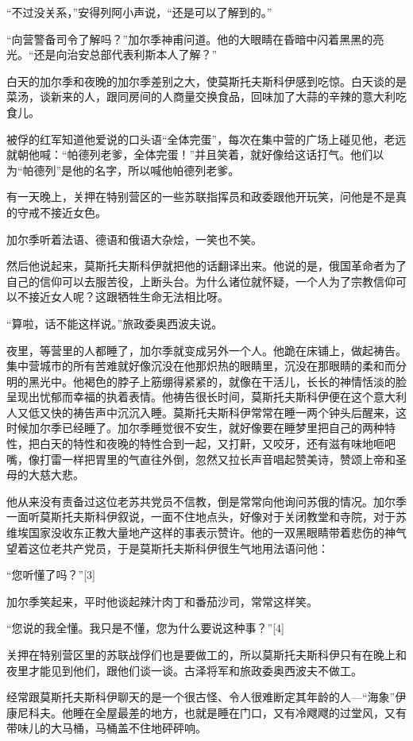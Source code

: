 “不过没关系，”安得列阿小声说，“还是可以了解到的。”

“向营警备司令了解吗？”加尔季神甫问道。他的大眼睛在昏暗中闪着黑黑的亮光。“还是向治安总部代表利斯本人了解？”

白天的加尔季和夜晚的加尔季差别之大，使莫斯托夫斯科伊感到吃惊。白天谈的是菜汤，谈新来的人，跟同房间的人商量交换食品，回味加了大蒜的辛辣的意大利吃食儿。

被俘的红军知道他爱说的口头语“全体完蛋”，每次在集中营的广场上碰见他，老远就朝他喊：“帕德列老爹，全体完蛋！”并且笑着，就好像给这话打气。他们以为“帕德列”是他的名字，所以喊他帕德列老爹。

有一天晚上，关押在特别营区的一些苏联指挥员和政委跟他开玩笑，问他是不是真的守戒不接近女色。

加尔季听着法语、德语和俄语大杂烩，一笑也不笑。

然后他说起来，莫斯托夫斯科伊就把他的话翻译出来。他说的是，俄国革命者为了自己的信仰可以去服苦役，上断头台。为什么诸位就怀疑，一个人为了宗教信仰可以不接近女人呢？这跟牺牲生命无法相比呀。

“算啦，话不能这样说。”旅政委奥西波夫说。

夜里，等营里的人都睡了，加尔季就变成另外一个人。他跪在床铺上，做起祷告。集中营城市的所有苦难就好像沉没在他那炽热的眼睛里，沉没在那眼睛的柔和而分明的黑光中。他褐色的脖子上筋绷得紧紧的，就像在干活儿，长长的神情恬淡的脸呈现出忧郁而幸福的执着表情。他祷告很长时间，莫斯托夫斯科伊便在这个意大利人又低又快的祷告声中沉沉入睡。莫斯托夫斯科伊常常在睡一两个钟头后醒来，这时候加尔季已经睡了。加尔季睡觉很不安生，就好像要在睡梦里把自己的两种特性，把白天的特性和夜晚的特性合到一起，又打鼾，又咬牙，还有滋有味地咂吧嘴，像打雷一样把胃里的气直往外倒，忽然又拉长声音唱起赞美诗，赞颂上帝和圣母的大慈大悲。

他从来没有责备过这位老苏共党员不信教，倒是常常向他询问苏俄的情况。加尔季一面听莫斯托夫斯科伊叙说，一面不住地点头，好像对于关闭教堂和寺院，对于苏维埃国家没收东正教大量地产这样的事表示赞许。他的一双黑眼睛带着悲伤的神气望着这位老共产党员，于是莫斯托夫斯科伊很生气地用法语问他：

“您听懂了吗？”[3]

加尔季笑起来，平时他谈起辣汁肉丁和番茄沙司，常常这样笑。

“您说的我全懂。我只是不懂，您为什么要说这种事？”[4]

关押在特别营区里的苏联战俘们也是要做工的，所以莫斯托夫斯科伊只有在晚上和夜里才能见到他们，跟他们谈一谈。古泽将军和旅政委奥西波夫不做工。

经常跟莫斯托夫斯科伊聊天的是一个很古怪、令人很难断定其年龄的人—“海象”伊康尼科夫。他睡在全屋最差的地方，也就是睡在门口，又有冷飕飕的过堂风，又有带味儿的大马桶，马桶盖不住地砰砰响。

